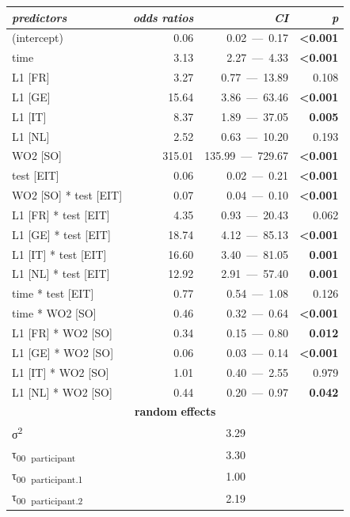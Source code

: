\begin{table}
    \begin{tabularx}{\textwidth}{Xrrr}
    \lsptoprule
    \textit{predictors} & \textit{odds} \textit{ratios} & \textit{CI} & \textit{p}\\
    \midrule
    (intercept) & 0.06 & 0.02~—~0.17 & \textbf{<0.001}\\
    time & 3.13 & 2.27~—~4.33 & \textbf{<0.001}\\
    L1 [FR] & 3.27 & 0.77~—~13.89 & 0.108\\
    L1 [GE] & 15.64 & 3.86~—~63.46 & \textbf{<0.001}\\
    L1 [IT] & 8.37 & 1.89~—~37.05 & \textbf{0.005}\\
    L1 [NL] & 2.52 & 0.63~—~10.20 & 0.193\\
    WO2 [SO] & 315.01 & 135.99~—~729.67 & \textbf{<0.001}\\
    test [EIT] & 0.06 & 0.02~—~0.21 & \textbf{<0.001}\\
    WO2 [SO] * test [EIT] & 0.07 & 0.04~—~0.10 & \textbf{<0.001}\\
    L1 [FR] * test [EIT] & 4.35 & 0.93~—~20.43 & 0.062\\
    L1 [GE] * test [EIT] & 18.74 & 4.12~—~85.13 & \textbf{<0.001}\\
    L1 [IT] * test [EIT] & 16.60 & 3.40~—~81.05 & \textbf{0.001}\\
    L1 [NL] * test [EIT] & 12.92 & 2.91~—~57.40 & \textbf{0.001}\\
    time * test [EIT] & 0.77 & 0.54~—~1.08 & 0.126\\
    time * WO2 [SO] & 0.46 & 0.32~—~0.64 & \textbf{<0.001}\\
    L1 [FR] * WO2 [SO] & 0.34 & 0.15~—~0.80 & \textbf{0.012}\\
    L1 [GE] * WO2 [SO] & 0.06 & 0.03~—~0.14 & \textbf{<0.001}\\
    L1 [IT] * WO2 [SO] & 1.01 & 0.40~—~2.55 & 0.979\\
    L1 [NL] * WO2 [SO] & 0.44 & 0.20~—~0.97 & \textbf{0.042}\\
    \multicolumn{4}{c}{\textbf{random} \textbf{effects}}\\
    σ\textsuperscript{2} & \multicolumn{3}{c}{3.29}\\
    τ\textsubscript{00}~\textsubscript{participant} & \multicolumn{3}{c}{3.30}\\
    τ\textsubscript{00}~\textsubscript{participant.1} & \multicolumn{3}{c}{1.00}\\
    τ\textsubscript{00}~\textsubscript{participant.2} & \multicolumn{3}{c}{2.19}\\

\end{tabularx}
\end{table}

